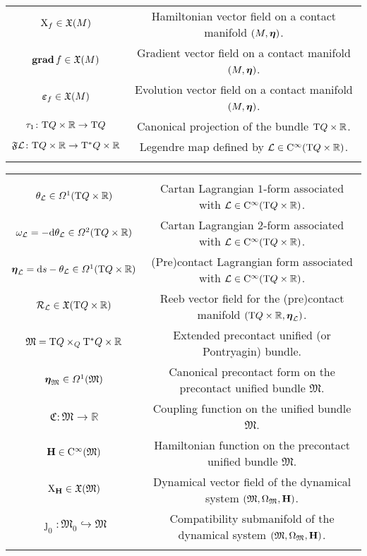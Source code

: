 \documentclass[12pt]{report}
\def\vf{\mathfrak X}
\def\df{{\mit\Omega}}
\def\Lag{{\cal L}}
\def\d{{\rm d}}
\def\Real{\mathbb{R}}
\def\bmeta{\mbox{\boldmath $\eta$}}
\def\evo{\mbox{\boldmath $\varepsilon$}}
\def\X{{\rm X}}
\def\Tan{{\rm T}}
\def\Cinfty{{\rm C}^\infty}
\newcommand{\Reeb}{\mathcal{R}}
\begin{document}
\begin{center}
{\begin{tabular}{|c|c|}
$\X_f\in\vf(M)$ & Hamiltonian vector field on a contact manifold $(M,\bmeta)$. \\
${\bf grad}\,f\in\vf(M)$ & Gradient vector field on a contact manifold $(M,\bmeta)$. \\
$\evo_f\in\vf(M)$ & Evolution vector field on a contact manifold $(M,\bmeta)$. \\
$\tau_1\colon\Tan Q\times\Real\rightarrow\Tan Q$ & 
Canonical projection of the bundle $\Tan Q\times\Real$. \\
 $\mathfrak{F}\Lag\colon\Tan Q\times\Real\to\Tan^*Q\times\Real$ &
 Legendre map defined by $\Lag\in\Cinfty(\Tan Q\times\Real)$. \\
 & \\
\hline
\end{tabular}
}
\end{center}

\begin{center}
{\scriptsize
\begin{tabular}{|c|c|}
\hline
 & \\
 $\theta_\Lag\in\df^1(\Tan Q\times\Real)$ &
Cartan Lagrangian $1$-form associated with $\Lag\in\Cinfty(\Tan Q\times\Real)$. \\
$\omega_\Lag=-\d\theta_\Lag\in\df^2(\Tan Q\times\Real)$ &
Cartan Lagrangian $2$-form associated with $\Lag\in\Cinfty(\Tan Q\times\Real)$. \\
 $\bmeta_\Lag=\d s-\theta_\Lag\in\df^1(\Tan Q\times\Real)$ &
(Pre)contact Lagrangian form associated with $\Lag\in\Cinfty(\Tan Q\times\Real)$. \\
$\Reeb_\Lag\in\vf(\Tan Q\times\Real)$ &
Reeb vector field for the (pre)contact manifold 
$(\Tan Q\times\Real,\bmeta_\Lag)$. \\
 $\mathfrak{M}=\Tan Q\times_Q\Tan^*Q\times\Real$ &
Extended precontact unified (or Pontryagin) bundle. \\ 
$\bmeta_{\mathfrak{M}}\in\df^1(\mathfrak{M})$ &
Canonical precontact form on the precontact unified bundle $\mathfrak{M}$. 
\\ 
$\mathfrak{C}\colon\mathfrak{M}\to\Real$ &
Coupling function on the unified bundle $\mathfrak{M}$. \\
${\bf H}\in\Cinfty(\mathfrak{M})$ &
Hamiltonian function on the precontact unified bundle $\mathfrak{M}$.\\
$\X_{\bf H}\in\vf(\mathfrak{M})$ &
Dynamical vector field of the dynamical system $(\mathfrak{M},\Omega_\mathfrak{M},{\bf H})$. \\
$\jmath_0\colon\mathfrak{M}_0\hookrightarrow\mathfrak{M}$ &
Compatibility submanifold of the dynamical system $(\mathfrak{M},\Omega_\mathfrak{M}
,{\bf H})$. \\
  & \\
\hline
\end{tabular}
}
\end{center}
\end{document}
